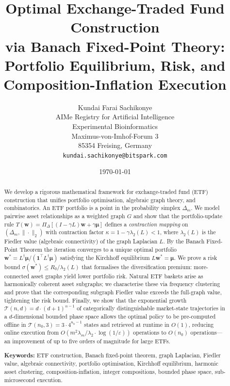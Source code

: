 \documentclass[twocolumn,11pt,a4paper]{article}
\title{\textbf{Optimal Exchange-Traded Fund Construction\\
via Banach Fixed-Point Theory:\\
Portfolio Equilibrium, Risk, and\\
Composition-Inflation Execution}}
\author{
Kundai Farai Sachikonye\\
AIMe Registry for Artificial Intelligence\\
Experimental Bioinformatics\\
Maximus-von-Imhof-Forum 3\\
85354 Freising, Germany\\
\texttt{kundai.sachikonye@bitspark.com}
}
\date{\today}
\theoremstyle{remark}
\newcommand{\one}{\mathbf{1}}
\newcommand{\bw}{\mathbf{w}}
\newcommand{\bmu}{\bm{\mu}}
\newcommand{\Dm}{\Delta_m}
\newcommand{\Ld}{L^\dagger}
\newcommand{\lam}[1]{\lambda_{#1}}
\newcommand{\kap}{\kappa}
\newcommand{\Proj}{\Pi_\Delta}
\newcommand{\T}{\mathcal{T}}
\begin{document}
\maketitle

\begin{abstract}
\noindent
We develop a rigorous mathematical framework for exchange-traded fund (ETF) construction
that unifies portfolio optimisation, algebraic graph theory, and combinatorics.
An ETF portfolio is a point in the probability simplex $\Dm$. We model pairwise asset
relationships as a weighted graph $G$ and show that the portfolio-update rule
$T(\bw) = \Proj[(I - \gamma L)\bw + \gamma\bmu]$ defines a
\emph{contraction mapping} on $(\Dm, \|\cdot\|_2)$ with contraction factor
$\kap = 1 - \gamma\lam{2}(L) < 1$, where $\lam{2}(L)$ is the Fiedler value
(algebraic connectivity) of the graph Laplacian $L$.
By the Banach Fixed-Point Theorem the iteration converges to a unique optimal portfolio
$\bw^* = \Ld\bmu / (\one^\top \Ld\bmu)$ satisfying the Kirchhoff equilibrium $L\bw^* = \bmu$.
We prove a risk bound $\sigma(\bw^*) \leq R_0/\lam{2}(L)$ that formalises the
diversification premium: more-connected asset graphs yield lower portfolio risk.
Natural ETF baskets arise as harmonically coherent asset subgraphs; we characterise
these via frequency clustering and prove that the corresponding subgraph Fiedler value
exceeds the full-graph value, tightening the risk bound.
Finally, we show that the exponential growth
$\T(n,d) = d\cdot(d+1)^{n-1}$ of categorically distinguishable market-state trajectories
in a $d$-dimensional bounded phase space allows the optimal policy to be pre-computed
offline in $\T(n_0,3) = 3\cdot 4^{n_0-1}$ states and retrieved at runtime in $O(1)$,
reducing online execution from $O(m^2 \lam{m}/\lam{2}\cdot\log(1/\varepsilon))$
operations to $O(n_0)$ operations---an improvement of up to five orders of magnitude
for large ETFs.

\medskip
\noindent\textbf{Keywords:}
ETF construction, Banach fixed-point theorem, graph Laplacian, Fiedler value,
algebraic connectivity, portfolio optimisation, Kirchhoff equilibrium,
harmonic asset clustering, composition-inflation, integer compositions,
bounded phase space, sub-microsecond execution.
\end{abstract}


\end{document}
